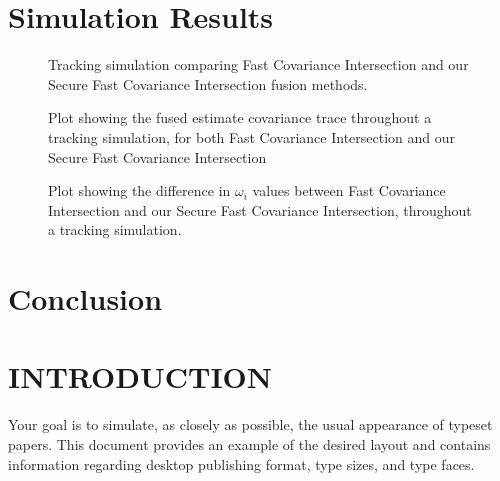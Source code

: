 \documentclass[letterpaper, 10 pt, conference]{ieeeconf}  %
\begin{document}
\section{Simulation Results}
\begin{figure}[htb]
   \begin{center}
      
   \end{center}
   \caption{Tracking simulation comparing Fast Covariance Intersection and our Secure Fast Covariance Intersection fusion methods.}
\end{figure}

\begin{figure}[htb]
   \begin{center}
      
   \end{center}
   \caption{Plot showing the fused estimate covariance trace throughout a tracking simulation, for both Fast Covariance Intersection and our Secure Fast Covariance Intersection}
\end{figure}

\begin{figure}[htb]
   \begin{center}
      
   \end{center}
   \caption{Plot showing the difference in $\omega_i$ values between Fast Covariance Intersection and our Secure Fast Covariance Intersection, throughout a tracking simulation.}
\end{figure}




\section{Conclusion}



\vspace{2cm}
\section{INTRODUCTION}

Your goal is to simulate, as closely as possible, the usual appearance of typeset
 papers. This document provides an example of the desired layout and contains
 information regarding desktop publishing format, type sizes, and type faces.
\end{document}
